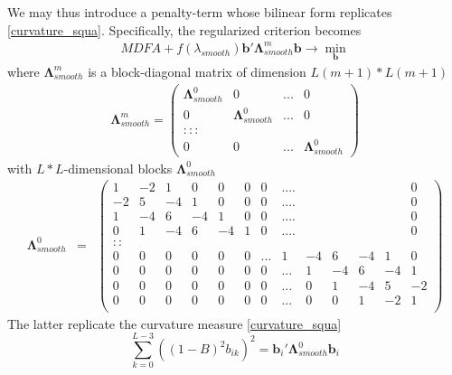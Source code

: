 \documentclass[a4paper]{book}
\begin{document}
We may thus introduce a penalty-term whose bilinear form replicates \ref{curvature_squa}. Specifically, the regularized criterion becomes
\begin{eqnarray}\label{smooth_term}
MDFA+f(\lambda_{smooth})\mathbf{b}'\boldsymbol{\Lambda}_{smooth}^m\mathbf{b}\to \min_{\mathbf{b}}
\end{eqnarray}
where  $\boldsymbol{\Lambda}_{smooth}^m$ is a block-diagonal matrix of dimension $L(m+1)*L(m+1)$
\begin{eqnarray*}
\boldsymbol{\Lambda}_{smooth}^m=\left(\begin{array}{cccc}\boldsymbol{\Lambda}_{smooth}^0&0&...&0\\
                                              0&\boldsymbol{\Lambda}_{smooth}^0&...&0\\
                                              :::\\
                                              0&0&...&\boldsymbol{\Lambda}_{smooth}^0                                              
                                              \end{array}\right)
\end{eqnarray*}
with $L*L$-dimensional blocks $\boldsymbol{\Lambda}_{smooth}^0$
\begin{eqnarray*}
\boldsymbol{\Lambda}_{smooth}^0&=&\left(\begin{array}{ccccccccccccc}
1 &-2&1 &  0&0&0 &0&....&  &   &   &   &  0\\
-2& 5&-4&1 &0&0 &0&....&  &   &   &   &  0\\
1 &-4& 6&-4&1&0 &0&....&  &   &   &   &  0\\
0 &1 &-4& 6&-4&1&0&....&  &   &   &   &  0\\
::\\
0 & 0& 0&0&0 &0&...&1 &-4& 6&-4& 1& 0\\
0 &0 & 0& 0&0&0 &0&...&1 &-4& 6&-4& 1\\
0 &0 & 0& 0&0&0 &0&...&0 & 1 &-4& 5&-2\\
0 &0 & 0& 0&0&0 &0&...&0 & 0 &1 &-2&1  \\
\end{array}\right)
\end{eqnarray*}
The latter replicate the curvature measure \ref{curvature_squa} 
\[\sum_{k=0}^{L-3} \left((1-B)^2 b_{ik}\right)^2=\mathbf{b}_i'\boldsymbol{\Lambda}_{smooth}^0\mathbf{b}_i\]
\end{document}
